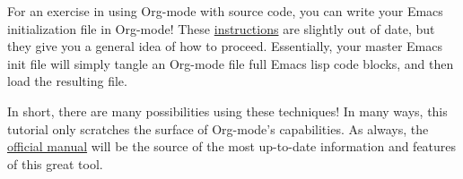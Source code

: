 \documentclass[11pt]{article}
\begin{document}
For an exercise in using Org-mode with source code, you can write your Emacs initialization file in Org-mode! These \href{http://orgmode.org/worg/org-contrib/babel/intro.php#sec-8_2_1}{instructions} are slightly out of date, but they give you a general idea of how to proceed. Essentially, your master Emacs init file will simply tangle an Org-mode file full Emacs lisp code blocks, and then load the resulting file.

In short, there are many possibilities using these techniques! In many ways, this tutorial only scratches the surface of Org-mode's capabilities. As always, the \href{http://orgmode.org/manual/index.html#Top}{official manual} will be the source of the most up-to-date information and features of this great tool.
\end{document}
